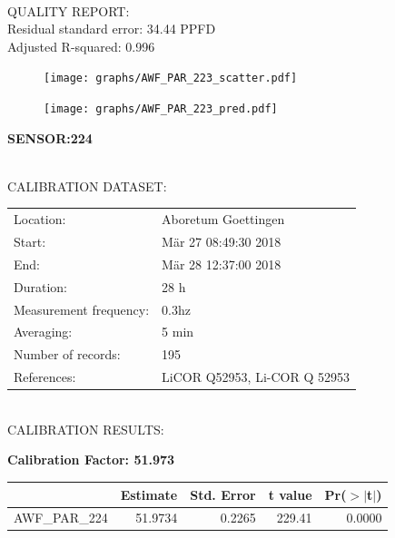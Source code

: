 \documentclass[oneside]{report}
\begin{document}
\hrulefill\\
QUALITY REPORT:\\
Residual standard error: 34.44 PPFD\\
Adjusted R-squared: 0.996



\begin{figure}[H]
  \centering
  \texttt{[image: graphs/AWF\_PAR\_223\_scatter.pdf]}
\end{figure}




\begin{figure}[H]
  \centering
  \texttt{[image: graphs/AWF\_PAR\_223\_pred.pdf]}
\end{figure}

\pagebreak


\begin{center}
\large{\textbf{SENSOR:224}}\\
\end{center}

\hrulefill\\
CALIBRATION DATASET:\\
\begin{table}[h!]
  \centering
  \label{tab:table1}
  \begin{tabular}{ll}
    Location: & Aboretum Goettingen\\ 
    
    
    Start:  & Mär 27 08:49:30 2018 \\
    End:   & Mär 28 12:37:00 2018\\ 
    Duration: & 28 h\\
    Measurement frequency: & 0.3hz\\
    Averaging:  &5 min\\
    Number of records: & 195 \\
    References: & LiCOR Q52953, Li-COR Q 52953 \\
  \end{tabular}
\end{table}

\hrulefill\\
CALIBRATION RESULTS:\\


\begin{center}
\textbf{\large{Calibration Factor: 51.973}}\\
\end{center}
\begin{table}[ht]
\centering
\begin{tabular}{rrrrr}
  \hline
 & Estimate & Std. Error & t value & Pr($>$$|$t$|$) \\ 
  \hline
AWF\_PAR\_224 & 51.9734 & 0.2265 & 229.41 & 0.0000 \\ 
   \hline
\end{tabular}
\end{table}
\end{document}
